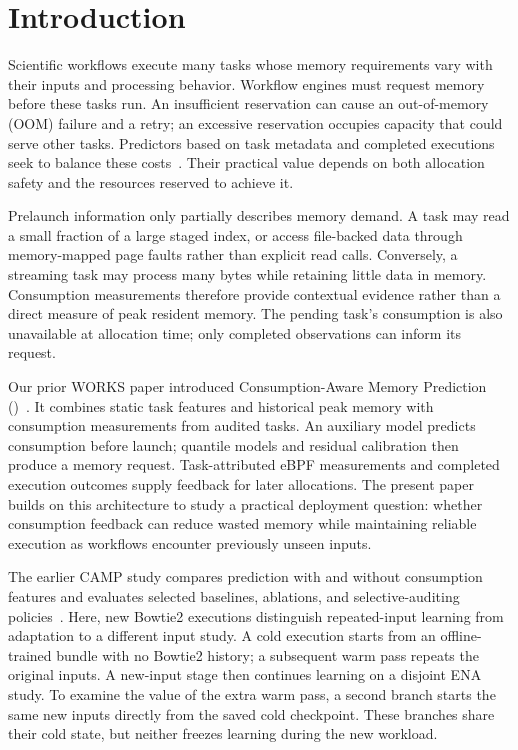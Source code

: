 \section{Introduction}
\label{sec:Introduction}
Scientific workflows execute many tasks whose memory requirements vary
with their inputs and processing behavior. Workflow engines must request
memory before these tasks run. An insufficient reservation can cause an
out-of-memory (OOM) failure and a retry; an excessive reservation occupies
capacity that could serve other tasks. Predictors based on task metadata
and completed executions seek to balance these
costs~\cite{witt2019feedback,lehmann2024ponder,bader2024sizey}. Their practical
value depends on both allocation safety and the resources reserved to
achieve it.

Prelaunch information only partially describes memory demand. A task may
read a small fraction of a large staged index, or access file-backed data
through memory-mapped page faults rather than explicit read calls.
Conversely, a streaming task may process many bytes while retaining little
data in memory. Consumption measurements therefore provide contextual
evidence rather than a direct measure of peak resident memory. The pending
task's consumption is also unavailable at allocation time; only completed
observations can inform its request.

Our prior WORKS paper introduced Consumption-Aware Memory Prediction
(\toolname)~\cite{camp2026works}. It combines static task features and
historical peak memory with consumption measurements from audited tasks.
An auxiliary model predicts consumption before launch; quantile models
and residual calibration then produce a memory request. Task-attributed
eBPF measurements and completed execution outcomes supply feedback for
later allocations. The present paper builds on this architecture to
study a practical deployment question: whether consumption feedback can
reduce wasted memory while maintaining reliable execution as workflows
encounter previously unseen inputs.

The earlier CAMP study compares prediction with and without consumption
features and evaluates selected baselines, ablations, and selective-auditing
policies~\cite{camp2026works}. Here, new Bowtie2 executions distinguish
repeated-input learning from adaptation to a different input study.
A cold execution starts from an offline-trained bundle with no Bowtie2
history; a subsequent warm pass repeats the original inputs. A new-input
stage then continues learning on a disjoint ENA study. To examine the value
of the extra warm pass, a second branch starts the same new inputs directly
from the saved cold checkpoint. These branches share their cold state,
but neither freezes learning during the new workload.

